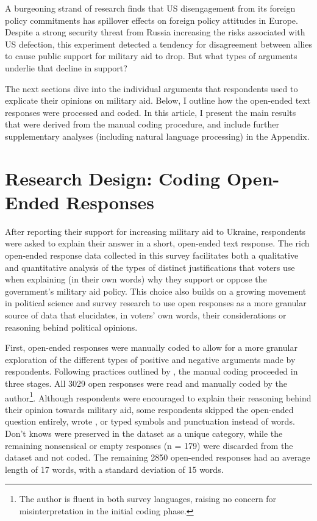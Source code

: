 A burgeoning strand of research finds that US disengagement from its foreign policy commitments has spillover effects on foreign policy attitudes in Europe.\autocite{blankenship_threats_2024, jakob_barrett_how_2026} Despite a strong security threat from Russia increasing the risks associated with US defection, this experiment detected a tendency for disagreement between allies to cause public support for military aid to drop. But what types of arguments underlie that decline in support? 

The next sections dive into the individual arguments that respondents used to explicate their opinions on military aid. Below, I outline how the open-ended text responses were processed and coded. In this article, I present the main results that were derived from the manual coding procedure, and include further supplementary analyses (including natural language processing) in the Appendix. 

\section{Research Design: Coding Open-Ended Responses}
After reporting their support for increasing military aid to Ukraine, respondents were asked to explain their answer in a short, open-ended text response. The rich open-ended response data collected in this survey facilitates both a qualitative and quantitative analysis of the types of distinct justifications that voters use when explaining (in their own words) why they support or oppose the government's military aid policy. This choice also builds on a growing movement in political science and survey research to use open responses as a more granular source of data that elucidates, in voters’ own words, their considerations or reasoning behind political opinions.

First, open-ended responses were manually coded to allow for a more granular exploration of the different types of positive and negative arguments made by respondents. Following practices outlined by \citeauthor{krippendorff_content_2019}, the manual coding proceeded in three stages. All 3029 open responses were read and manually coded by the author\footnote{The author is fluent in both survey languages, raising no concern for misinterpretation in the initial coding phase.}. Although respondents were encouraged to explain their reasoning behind their opinion towards military aid, some respondents skipped the open-ended question entirely, wrote , or typed symbols and punctuation instead of words. Don't knows were preserved in the dataset as a unique category, while the remaining nonsensical or empty responses (n = 179) were discarded from the dataset and not coded. The remaining 2850 open-ended responses had an average length of 17 words, with a standard deviation of 15 words. 

